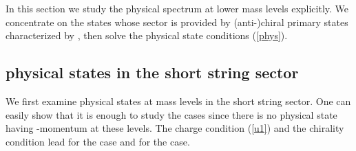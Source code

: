 \documentclass[a4paper,seceq,preprint]{ptptex}
\begin{document}
In this section
we study the physical spectrum at lower mass levels explicitly.
We concentrate on the states whose \coordHE{} sector is 
provided by (anti-)chiral primary states characterized 
by \coordHE{}, then solve the physical state 
conditions (\ref{phys}).

\subsection{physical states in the short string sector}

We first examine physical states at mass levels 
\coordHE{} in the short string sector.
One can easily show that it is enough to study the \coordHE{} 
cases since there is no physical state having 
\coordHE{}-momentum \coordHE{} at these levels.
The \coordHE{} charge condition (\ref{u1}) and the chirality 
condition \coordHE{} lead 
\coordHE{} for the \coordHE{} case
and \coordHE{} for the \coordHE{} case. 
\end{document}
